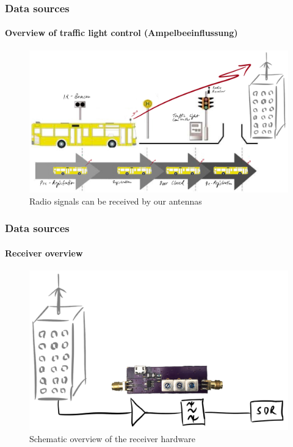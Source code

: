 \documentclass[aspectratio=169]{beamer}
\begin{document}

\begin{frame}
\frametitle{Data sources}
\framesubtitle{Overview of traffic light control (Ampelbeeinflussung)}
\begin{figure}
\centering
\includegraphics[height=0.65\textheight]{figs/lsa-beeinflussungs-stecke-mit-antenne.pdf}
\caption{Radio signals can be received by our antennas}
\end{figure}
\end{frame}


\begin{frame}
\frametitle{Data sources}
\framesubtitle{Receiver overview}
\begin{figure}
\centering
\includegraphics[height=0.65\textheight]{figs/antenna-filter.pdf}
\caption{Schematic overview of the receiver hardware}
\end{figure}
\end{frame}
\end{document}
